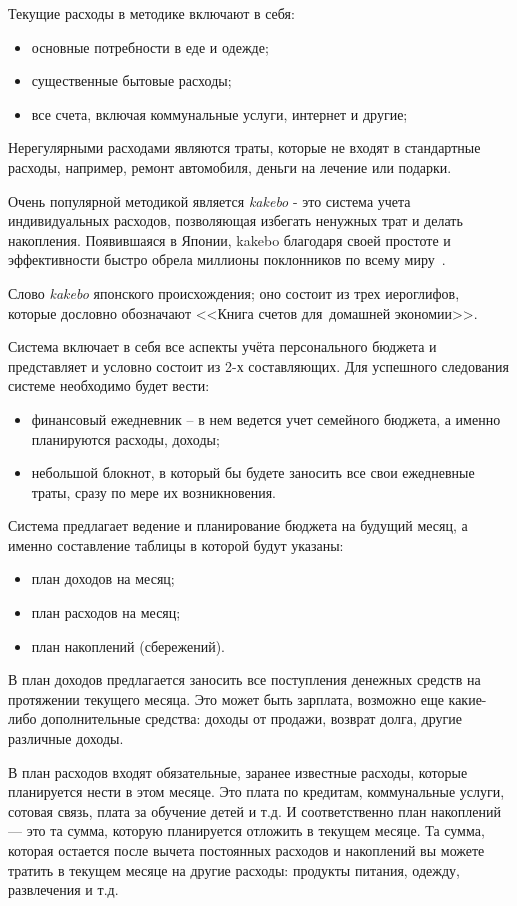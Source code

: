 Текущие расходы в методике включают в себя:
\begin{itemize}
    \item основные потребности в еде и одежде;
    \item существенные бытовые расходы;
    \item все счета, включая коммунальные услуги, интернет и другие;
\end{itemize}

Нерегулярными расходами являются траты, которые не входят в стандартные расходы, например, ремонт автомобиля, деньги на лечение или подарки.

Очень популярной методикой является \emph{kakebo} - это система учета индивидуальных расходов, позволяющая избегать ненужных трат и делать накопления.
Появившаяся в Японии, kakebo благодаря своей простоте и эффективности быстро обрела миллионы поклонников по всему миру~\cite{kakebo}.

Слово \emph{kakebo} японского происхождения; оно состоит из трех иероглифов, которые дословно обозначают <<Книга счетов для домашней экономии>>.

Система включает в себя все аспекты учёта персонального бюджета и представляет и условно состоит из 2-х составляющих.
Для успешного следования системе необходимо будет вести:
\begin{itemize}
\item финансовый ежедневник -- в нем ведется учет семейного бюджета, а именно планируются расходы, доходы;
\item небольшой блокнот, в который бы будете заносить все свои ежедневные траты, сразу по мере их возникновения.
\end{itemize}
Система предлагает ведение и планирование бюджета на будущий месяц, а именно составление таблицы в которой будут указаны:
\begin{itemize}
\item план доходов на месяц;
\item план расходов на месяц;
\item план накоплений (сбережений).
\end{itemize}

В план доходов предлагается заносить все поступления денежных средств на протяжении текущего месяца.
Это может быть зарплата, возможно еще какие-либо дополнительные средства: доходы от продажи, возврат долга, другие различные доходы.

В план расходов входят обязательные, заранее известные расходы, которые планируется нести в этом месяце.
Это плата по кредитам, коммунальные услуги, сотовая связь, плата за обучение детей и т.д.
И соответственно план накоплений — это та сумма, которую планируется отложить в текущем месяце.
Та сумма, которая остается после вычета постоянных расходов и накоплений вы можете тратить в текущем месяце на другие расходы: продукты питания, одежду, развлечения и т.д.

